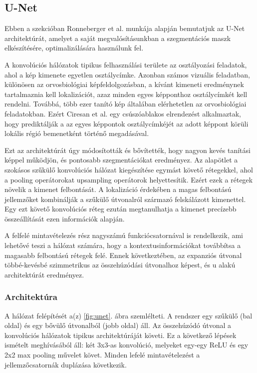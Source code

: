 \documentclass[12pt,a4]{article}
\begin{document}
    \subsection{U-Net}

    Ebben a szekcióban Ronneberger et al. \cite{unet} munkája alapján bemutatjuk az U-Net architektúrát, amelyet a saját megvalósításunkban a szegmentációs maszk elkészítésére, optimalizálására használunk fel. 

    A konvolúciós hálózatok tipikus felhasználási területe az osztályozási feladatok, ahol
a kép kimenete egyetlen osztálycímke. Azonban számos vizuális feladatban,
különösen az orvosbiológiai képfeldolgozásban, a kívánt kimeneti eredménynek tartalmaznia kell
lokalizációt, azaz minden egyes képponthoz osztálycímkét kell rendelni. Továbbá,
több ezer tanító kép általában elérhetetlen az orvosbiológiai feladatokban.
Ezért Ciresan et al. \cite{ciresan} egy csúszóablakos elrendezést alkalmaztak, hogy prediktálják a
az egyes képpontok osztálycímkéjét az adott képpont körüli lokális régió bemenetként történő megadásával.

Ezt az architektúrát úgy módosították és bővítették, hogy
nagyon kevés tanítási képpel működjön, és pontosabb szegmentációkat eredményez.
Az alapötlet a szokásos szűkülő konvolúciós hálózat kiegészítése egymást követő rétegekkel, ahol a pooling operátorokat upsampling operátorok helyettesítik.
Ezért ezek a rétegek növelik a kimenet felbontását. A lokalizáció érdekében a magas
felbontású jellemzőket kombinálják a szűkülő útvonalról származó felskálázott kimenettel. Egy ezt követő konvolúciós réteg ezután megtanulhatja a kimenet precízebb összeállítását ezen információk alapján.

A felfelé mintavételezés
rész nagyszámú funkciócsatornával is rendelkezik, ami lehetővé teszi a hálózat számára, hogy
a kontextusinformációkat továbbítsa a magasabb felbontású rétegek felé. Ennek következtében,
az expanziós útvonal többé-kevésbé szimmetrikus az összehúzódási útvonalhoz képest, és
u alakú architektúrát eredményez.

\subsubsection{Architektúra}

A hálózat felépítését a(z) \ref{fig:unet}. ábra szemlélteti. A rendszer egy szűkülő
(bal oldal) és egy bővülő útvonalból (jobb oldal) áll. Az összehúzódó útvonal
a konvolúciós hálózatok tipikus architektúráját követi. 
Ez a következő lépések ismételt meghívásából áll:
    két 3x3-as konvolúció, melyeket egy-egy ReLU és egy 2x2 max pooling művelet követ. Minden lefelé mintavételezést a jellemzőcsatornák duplázása következik. 
\end{document}

